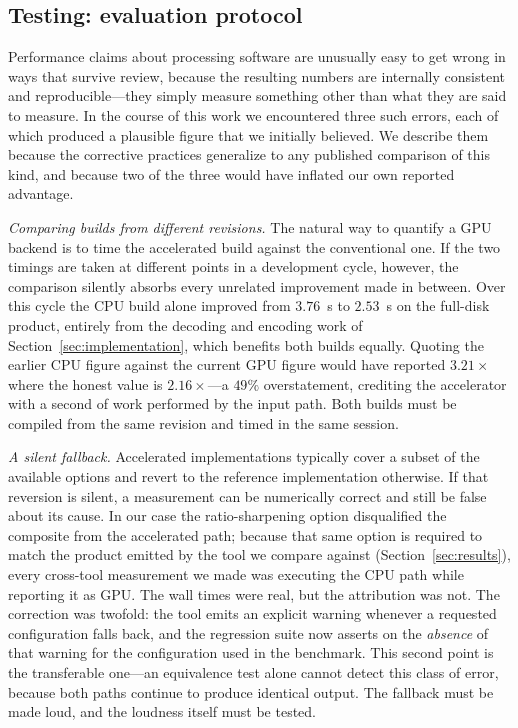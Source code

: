 \documentclass[11pt]{article}
\begin{document}
\subsection{Testing: evaluation protocol}
\label{sec:methodology}

Performance claims about processing software are unusually easy to get wrong in
ways that survive review, because the resulting numbers are internally
consistent and reproducible---they simply measure something other than what
they are said to measure. In the course of this work we encountered three such
errors, each of which produced a plausible figure that we initially believed.
We describe them because the corrective practices generalize to any published
comparison of this kind, and because two of the three would have inflated our
own reported advantage.

\textit{Comparing builds from different revisions.} The natural way to quantify
a GPU backend is to time the accelerated build against the conventional one.
If the two timings are taken at different points in a development cycle,
however, the comparison silently absorbs every unrelated improvement made in
between. Over this cycle the CPU build alone improved from $3.76$~s to
$2.53$~s on the full-disk product, entirely from the decoding and encoding work
of Section~\ref{sec:implementation}, which benefits both builds equally.
Quoting the earlier CPU figure against the current GPU figure would have
reported $3.21\times$ where the honest value is $2.16\times$---a $49\%$
overstatement, crediting the accelerator with a second of work performed by the
input path. Both builds must be compiled from the same revision and timed in
the same session.

\textit{A silent fallback.} Accelerated implementations typically cover a
subset of the available options and revert to the reference implementation
otherwise. If that reversion is silent, a measurement can be numerically
correct and still be false about its cause. In our case the ratio-sharpening
option disqualified the composite from the accelerated path; because that same
option is required to match the product emitted by the tool we compare against
(Section~\ref{sec:results}), every cross-tool measurement we made was executing
the CPU path while reporting it as GPU. The wall times were real, but the
attribution was not. The correction was twofold: the tool emits an explicit
warning whenever a requested configuration falls back, and the regression suite
now asserts on the \emph{absence} of that warning for the configuration used in
the benchmark. This second point is the transferable one---an equivalence test
alone cannot detect this class of error, because both paths continue to produce
identical output. The fallback must be made loud, and the loudness itself must
be tested.
\end{document}
